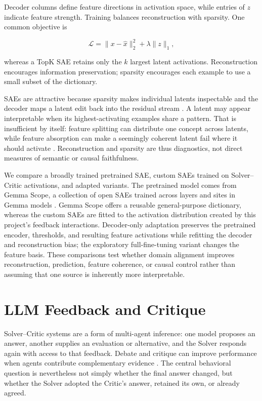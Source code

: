 Decoder columns define feature directions in activation space, while entries of $z$ indicate feature strength. Training balances reconstruction with sparsity. One common objective is

\begin{equation}
\mathcal{L}=\lVert x-\hat{x}\rVert_2^2+\lambda\lVert z\rVert_1,
\end{equation}

whereas a TopK SAE retains only the $k$ largest latent activations. Reconstruction encourages information preservation; sparsity encourages each example to use a small subset of the dictionary.

SAEs are attractive because sparsity makes individual latents inspectable and the decoder maps a latent edit back into the residual stream \cite{cunningham2023sparse}. A latent may appear interpretable when its highest-activating examples share a pattern. That is insufficient by itself: feature splitting can distribute one concept across latents, while feature absorption can make a seemingly coherent latent fail where it should activate \cite{chanin2024absorption}. Reconstruction and sparsity are thus diagnostics, not direct measures of semantic or causal faithfulness.

We compare a broadly trained pretrained SAE, custom SAEs trained on Solver--Critic activations, and adapted variants. The pretrained model comes from Gemma Scope, a collection of open SAEs trained across layers and sites in Gemma models \cite{lieberum2024gemmascope}. Gemma Scope offers a reusable general-purpose dictionary, whereas the custom SAEs are fitted to the activation distribution created by this project's feedback interactions. Decoder-only adaptation preserves the pretrained encoder, thresholds, and resulting feature activations while refitting the decoder and reconstruction bias; the exploratory full-fine-tuning variant changes the feature basis. These comparisons test whether domain alignment improves reconstruction, prediction, feature coherence, or causal control rather than assuming that one source is inherently more interpretable.

\section{LLM Feedback and Critique}

Solver--Critic systems are a form of multi-agent inference: one model proposes an answer, another supplies an evaluation or alternative, and the Solver responds again with access to that feedback. Debate and critique can improve performance when agents contribute complementary evidence \cite{du2024debate}. The central behavioral question is nevertheless not simply whether the final answer changed, but whether the Solver adopted the Critic's answer, retained its own, or already agreed.

